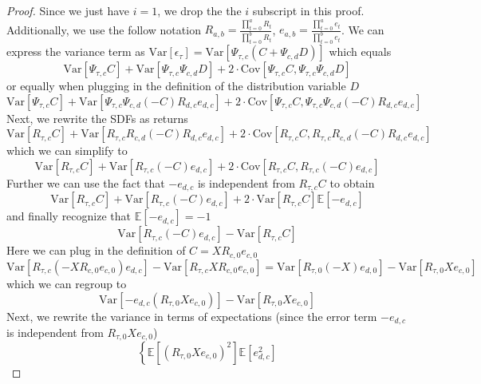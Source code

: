 \begin{proof}
	Since we just have $i=1$, we drop the the $i$ subscript in this proof.
	Additionally, we use the follow notation $R_{a,b} = \frac{\prod_{t=0}^{a} R_t}{\prod_{t=0}^{b} R_t}$, $e_{a,b} = \frac{\prod_{t=0}^{a} e_t}{\prod_{t=0}^{b} e_t}$.
	We can express the variance term as $\mathrm{Var} \left[ \epsilon_{\tau} \right] = \mathrm{Var} \left[ \Psi_{\tau,c} \left( C + \Psi_{c,d} D \right) \right]$
	which equals
	\[
	\mathrm{Var} \left[ \Psi_{\tau,c} C \right] +
	\mathrm{Var} \left[ \Psi_{\tau,c} \Psi_{c,d} D \right] +
	2 \cdot \mathrm{Cov} \left[ \Psi_{\tau,c} C, \Psi_{\tau,c} \Psi_{c,d} D \right]
	\]
	or equally when plugging in the definition of the distribution variable $D$
	\[
	\mathrm{Var} \left[ \Psi_{\tau,c} C \right] +
	\mathrm{Var} \left[ \Psi_{\tau,c} \Psi_{c,d} (-C)  R_{d,c} e_{d,c} \right] +
	2 \cdot \mathrm{Cov} \left[ \Psi_{\tau,c} C, \Psi_{\tau,c} \Psi_{c,d} (-C) R_{d,c} e_{d,c} \right]
	\]
	Next, we rewrite the SDFs as returns
	\[
	\mathrm{Var} \left[ R_{\tau,c} C \right] +
	\mathrm{Var} \left[ R_{\tau,c} R_{c,d} (-C)  R_{d,c} e_{d,c} \right] +
	2 \cdot \mathrm{Cov} \left[ R_{\tau,c} C, R_{\tau,c} R_{c,d} (-C) R_{d,c} e_{d,c} \right]
	\]
	which we can simplify to
	\[
	\mathrm{Var} \left[ R_{\tau,c} C \right] +
	\mathrm{Var} \left[ R_{\tau,c} (-C) e_{d,c} \right] +
	2 \cdot \mathrm{Cov} \left[ R_{\tau,c} C, R_{\tau,c} (-C) e_{d,c} \right]
	\]
	Further we can use the fact that $- e_{d,c}$ is independent from $R_{\tau,c} C$ to obtain
	\[
	\mathrm{Var} \left[ R_{\tau,c} C \right] +
	\mathrm{Var} \left[ R_{\tau,c} (-C) e_{d,c} \right] +
	2 \cdot \mathrm{Var} \left[ R_{\tau,c} C \right]
	\mathbb{E} \left[ - e_{d,c} \right]
	\]
	and finally recognize that $\mathbb{E} \left[ - e_{d,c} \right] = -1$
	\[
	\mathrm{Var} \left[ R_{\tau,c} (-C) e_{d,c} \right] -
	\mathrm{Var} \left[ R_{\tau,c} C \right]
	\]
	Here we can plug in the definition of $C=X R_{c, 0} e_{c, 0}$
	\[
	\mathrm{Var} \left[ R_{\tau,c} (-X R_{c, 0} e_{c, 0}) e_{d,c} \right] -
	\mathrm{Var} \left[ R_{\tau,c} X R_{c, 0} e_{c, 0} \right]
	=
	\mathrm{Var} \left[ R_{\tau,0} (-X ) e_{d,0} \right] -
	\mathrm{Var} \left[ R_{\tau,0} X e_{c, 0} \right]
	\]
	which we can regroup to
	\[
	\mathrm{Var} \left[ - e_{d,c} \left( R_{\tau,0} X e_{c, 0} \right)  \right] -
	\mathrm{Var} \left[ R_{\tau,0} X e_{c, 0} \right]
	\]
	Next, we rewrite the variance in terms of expectations (since the error term $- e_{d,c}$ is independent from $R_{\tau,0} X e_{c, 0}$)
	\[
	\left\{
	\mathbb{E} \left[ \left( R_{\tau,0} X e_{c, 0} \right)^2 \right]
	\mathbb{E} \left[ e_{d,c}^2 \right]
\]
\end{proof}
